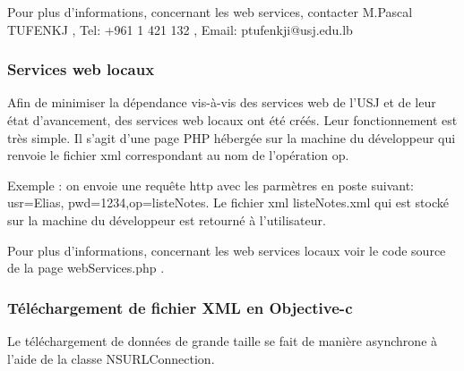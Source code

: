 	Pour plus d'informations, concernant les web services, contacter M.Pascal TUFENKJ , Tel: +961 1 421 132 , Email: ptufenkji@usj.edu.lb
	
		\subsubsection{Services web locaux}
		Afin de minimiser la dépendance vis-à-vis des  services web de l'USJ et de leur état d'avancement, des services web locaux ont été créés. Leur fonctionnement est très simple. Il s'agit d'une page PHP hébergée sur la machine du développeur qui renvoie le fichier xml correspondant au nom de l'opération op. 
		
		Exemple : on envoie une requête http avec les parmètres en poste suivant: usr=Elias, pwd=1234,op=listeNotes. Le fichier xml listeNotes.xml qui est stocké sur la machine du développeur est retourné à l'utilisateur. 
		
		Pour plus d'informations, concernant les web services locaux voir le code source de la page webServices.php .

		\subsubsection{Téléchargement de fichier XML en Objective-c}
		Le téléchargement de données de grande taille se fait de manière asynchrone à l'aide de la classe NSURLConnection. 
			\lstset{
			    style = Xcode,
			    caption=Téléchargement d'un fichier XML depuis internet de manière asynchrone et en transmettant les paramètres de la requête par POST .,
			    breaklines=true,
			    frame=single
			}
			

